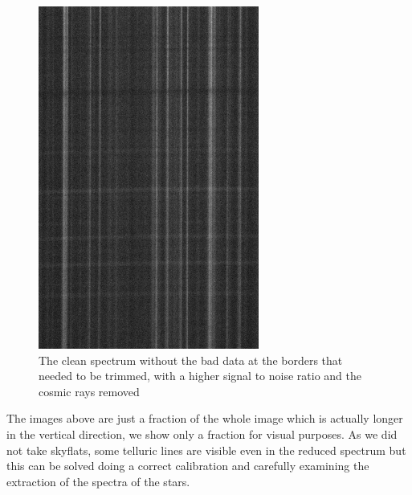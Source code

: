 \begin{figure}[H]
\begin{minipage}[b]{0.45\textwidth}
    \includegraphics[width=\textwidth]{images/cluster_clean.png}
    \caption[Clean spectrum of NGC5139]{The clean spectrum without the bad data at the borders that needed to be trimmed, with a higher signal to noise ratio and the cosmic rays removed}
  \end{minipage}
\end{figure}

The images above are just a fraction of the whole image which is actually longer in the vertical direction, we show only a fraction for visual purposes. As we did not take skyflats, some telluric lines are visible even in the reduced spectrum but this can be solved doing a correct calibration and carefully examining the extraction of the spectra of the stars.

